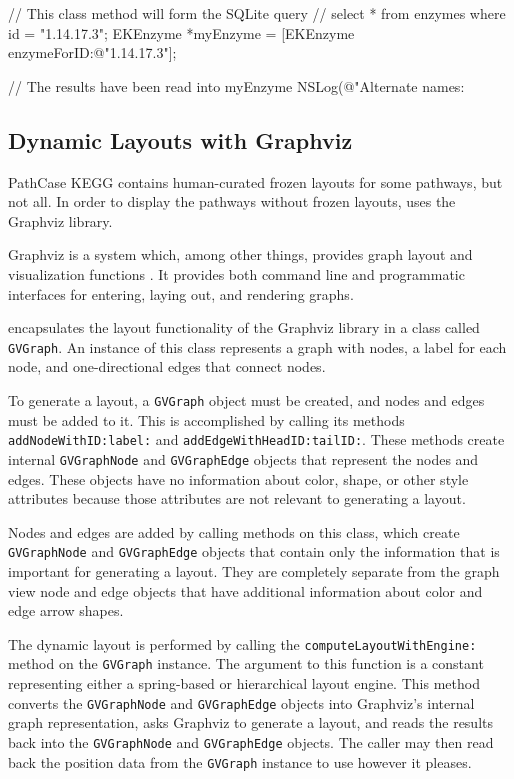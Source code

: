 \begin{objc}
    // This class method will form the SQLite query
    // select * from enzymes where id = "1.14.17.3";
    EKEnzyme *myEnzyme = [EKEnzyme enzymeForID:@"1.14.17.3"];

    // The results have been read into myEnzyme
    NSLog(@"Alternate names: %
\end{objc}

\subsection{Dynamic Layouts with Graphviz}
\label{sect:kegg_impl_graphviz}

PathCase KEGG contains human-curated frozen layouts for some pathways, but not
all. In order to display the pathways without frozen layouts, \keggapp
uses the Graphviz library.

Graphviz is a system which, among other things, provides graph layout and
visualization functions \cite{graphviz}. It provides both command line and
programmatic interfaces for entering, laying out, and rendering graphs.

\keggapp encapsulates the layout functionality of the Graphviz library in a
class called \texttt{GVGraph}. An instance of this class represents a graph with
nodes, a label for each node, and one-directional edges that connect nodes.

To generate a layout, a \texttt{GVGraph} object must be created, and nodes and
edges must be added to it. This is accomplished by calling its methods
\texttt{addNodeWithID:label:} and \texttt{addEdgeWithHeadID:tailID:}. These
methods create internal \texttt{GVGraphNode} and \texttt{GVGraphEdge} objects
that represent the nodes and edges. These objects have no information about
color, shape, or other style attributes because those attributes are not
relevant to generating a layout.

Nodes and edges are added by calling methods on this class, which create
\texttt{GVGraphNode} and \texttt{GVGraphEdge} objects that contain only the
information that is important for generating a layout. They are completely
separate from the graph view node and edge objects that have additional
information about color and edge arrow shapes.

The dynamic layout is performed by calling the \texttt{computeLayoutWithEngine:}
method on the \texttt{GVGraph} instance. The argument to this function is a
constant representing either a spring-based or hierarchical layout engine. This
method converts the \texttt{GVGraphNode} and \texttt{GVGraphEdge} objects into
Graphviz's internal graph representation, asks Graphviz to generate a layout,
and reads the results back into the \texttt{GVGraphNode} and
\texttt{GVGraphEdge} objects. The caller may then read back the position data
from the \texttt{GVGraph} instance to use however it pleases.

